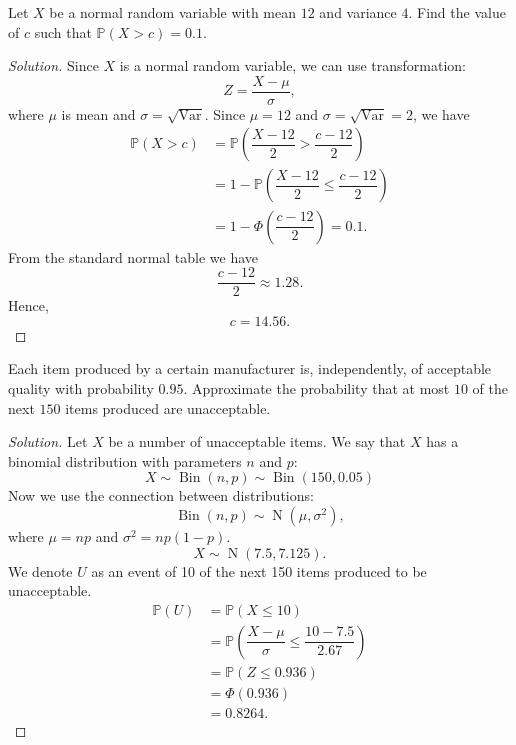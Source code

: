 \documentclass{article}[12pt]
\newenvironment{solution}
  {\renewcommand\qedsymbol{$\blacksquare$}\begin{proof}[Solution]}
  {\end{proof}}
\newenvironment{problem}[1]
  {\renewcommand\theinnercustomprblm{#1}\innercustomprblm}
  {\endinnercustomprblm}
\DeclareMathOperator{\Norm}{N}
\DeclareMathOperator{\Var}{Var}
\DeclareMathOperator{\Bin}{Bin}
\renewcommand{\P}{\mathbb{P}}
\begin{document}
\begin{problem}{5.19}\normalfont
Let $X$ be a normal random variable with mean $12$ and variance $4$. 
Find the value of $c$ such that $\mathbb{P}(X > c) = 0.1$.
\end{problem}
\begin{solution}
Since $X$ is a normal random variable, we can use transformation:
\begin{equation*}
    Z = \dfrac{X -\mu}{\sigma},
\end{equation*}
where $\mu$ is mean and $\sigma = \sqrt{\Var}$.
Since $\mu = 12$ and $\sigma = \sqrt{\Var} = 2$, we have
\begin{align*}
    \P(X > c) &=\P\left(\dfrac{X - 12}{2} > \dfrac{c - 12}{2}\right)
    \\
    &= 1 -\P\left(\dfrac{X - 12}{2}\leqslant\dfrac{c - 12}{2}\right)
    \\
    &= 1 -\Phi\left(\dfrac{c - 12}{2}\right) = 0.1.
\end{align*}
From the standard normal table we have
\begin{equation*}
    \dfrac{c - 12}{2}\approx 1.28.
\end{equation*}
Hence,
\begin{equation*}
    c = 14.56.
\end{equation*}
\end{solution}

\begin{problem}{5.25}\normalfont
Each item produced by a certain manufacturer is, independently, of acceptable quality with probability $0.95$. 
Approximate the probability that at most $10$ of the next $150$ items produced are unacceptable.
\end{problem}
\begin{solution}
Let $X$ be a number of unacceptable items.
We say that $X$ has a binomial distribution with parameters $n$ and $p$:
\begin{equation*}
    X\sim\Bin(n, p)\sim\Bin(150, 0.05)
\end{equation*}
Now we use the connection between distributions:
\begin{equation*}
    \Bin(n, p)\sim\Norm(\mu,\sigma^{2}),
\end{equation*}
where $\mu = np$ and $\sigma^{2} = np(1 - p)$.
\begin{equation*}
    X\sim\Norm(7.5, 7.125).
\end{equation*}
We denote $U$ as an event of 10 of the next 150 items produced to be unacceptable.
\begin{align*}
    \P(U) &=\P(X \leqslant 10)
    \\
    &=\P\left(\dfrac{X -\mu}{\sigma}\leqslant\dfrac{10 - 7.5}{2.67}\right)
    \\
    &=\P(Z\leqslant 0.936) 
    \\
    &=\Phi(0.936)
    \\
    &= 0.8264.
\end{align*}
\end{solution}
\end{document}
